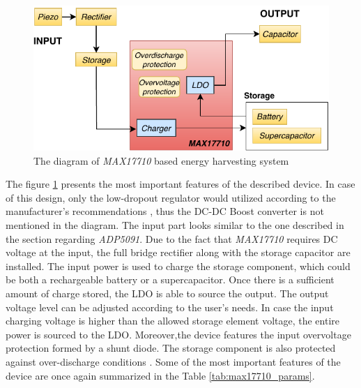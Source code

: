 \documentclass[12pt,a4paper]{article}
\begin{document}
\begin{figure}[ht!]
\includegraphics[scale=1.2]{MAX17710.pdf}
\caption{The diagram of \textit{MAX17710} based energy harvesting system}
\label{fig:max17710diagram}
\end{figure}

The figure \ref{fig:max17710diagram} presents the most important features of the described device. In case of this design, only the low-dropout regulator would utilized according to the manufacturer's recommendations \cite{max17710_params}, thus the DC-DC Boost converter is not mentioned in the diagram. The input part looks similar to the one described in the section regarding \textit{ADP5091}. Due to the fact that \textit{MAX17710} requires DC voltage at the input, the full bridge rectifier  along with the storage capacitor are installed. The input power is used to charge the storage component, which could be both a rechargeable battery or a supercapacitor. Once there is a sufficient amount of charge stored, the LDO is able to source the output. The output voltage level can be adjusted according to the user's needs. In case the input charging voltage is higher than the allowed storage element voltage, the entire power is sourced to the LDO. Moreover,the device features the input overvoltage protection formed by a shunt diode. The storage component is also protected against over-discharge conditions \cite{max17710_params}. Some of the most important features  of the device are once again summarized in the Table \ref{tab:max17710_params}.
\end{document}
